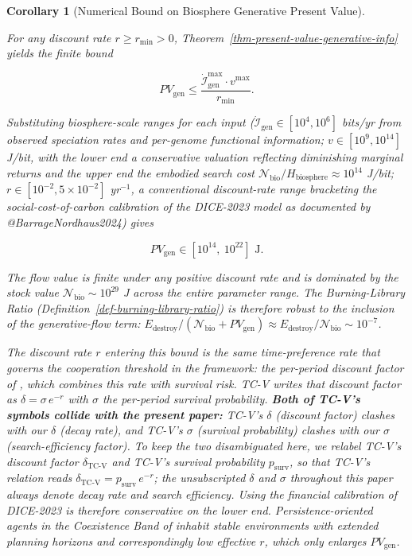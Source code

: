 \documentclass[11pt]{article}
\theoremstyle{plain}
\newtheorem{corollary}[theorem]{Corollary}
\theoremstyle{definition}
\theoremstyle{remark}
\begin{document}
\begin{corollary}[Numerical Bound on Biosphere Generative Present Value]
\label{cor-generative-pv-bound}

For any discount rate $r \geq r_{\min} > 0$, Theorem~\ref{thm-present-value-generative-info} yields the finite bound

$$PV_{\text{gen}} \leq \frac{\dot{\mathcal{I}}_{\text{gen}}^{\max} \cdot v^{\max}}{r_{\min}}.$$

Substituting biosphere-scale ranges for each input ($\dot{\mathcal{I}}_{\text{gen}} \in [10^4, 10^6]$ bits/yr from observed speciation rates and per-genome functional information; $v \in [10^9, 10^{14}]$ J/bit, with the lower end a conservative valuation reflecting diminishing marginal returns and the upper end the embodied search cost $\mathcal{N}_{\text{bio}}/H_{\text{biosphere}} \approx 10^{14}$ J/bit; $r \in [10^{-2}, 5 \times 10^{-2}]$ yr$^{-1}$, a conventional discount-rate range bracketing the social-cost-of-carbon calibration of the DICE-2023 model as documented by @BarrageNordhaus2024) gives

$$PV_{\text{gen}} \in \left[10^{14},\ 10^{22}\right] \text{ J}.$$

The flow value is finite under any positive discount rate and is dominated by the stock value $\mathcal{N}_{\text{bio}} \sim 10^{29}$ J across the entire parameter range. The Burning-Library Ratio (Definition~\ref{def-burning-library-ratio}) is therefore robust to the inclusion of the generative-flow term: $E_{\text{destroy}}/(\mathcal{N}_{\text{bio}} + PV_{\text{gen}}) \approx E_{\text{destroy}}/\mathcal{N}_{\text{bio}} \sim 10^{-7}$.

The discount rate $r$ entering this bound is the same time-preference rate that governs the cooperation threshold in the framework: the per-period discount factor of \citep{TC-V}, which combines this rate with survival risk. TC-V writes that discount factor as $\delta = \sigma\, e^{-r}$ with $\sigma$ the per-period survival probability. \textbf{Both of TC-V's symbols collide with the present paper:} TC-V's $\delta$ (discount factor) clashes with our $\delta$ (decay rate), and TC-V's $\sigma$ (survival probability) clashes with our $\sigma$ (search-efficiency factor). To keep the two disambiguated here, we relabel TC-V's discount factor $\delta_{\text{TC-V}}$ and TC-V's survival probability $p_{\text{surv}}$, so that TC-V's relation reads $\delta_{\text{TC-V}} = p_{\text{surv}}\, e^{-r}$; the unsubscripted $\delta$ and $\sigma$ throughout this paper always denote decay rate and search efficiency. Using the financial calibration of DICE-2023 \citep{BarrageNordhaus2024} is therefore conservative on the lower end. Persistence-oriented agents in the Coexistence Band of \citep{TC-VI} inhabit stable environments with extended planning horizons and correspondingly low effective $r$, which only enlarges $PV_{\text{gen}}$.


\end{corollary}
\end{document}
